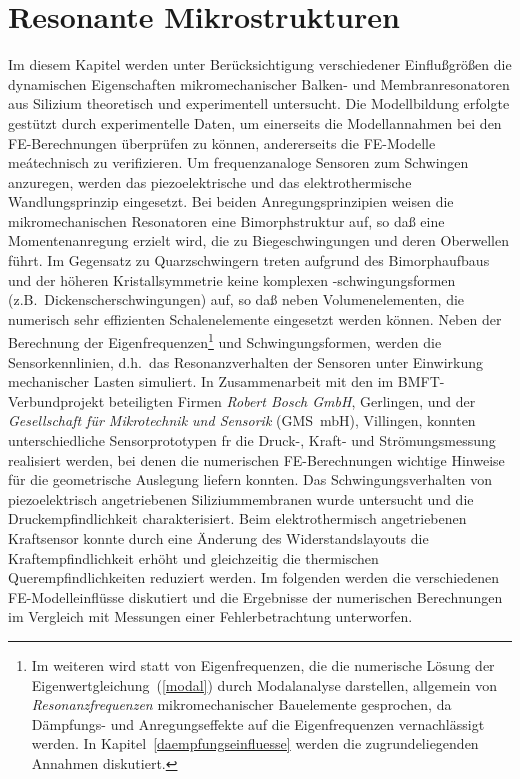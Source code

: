 \chapter{Resonante Mikrostrukturen}
\label{schwingungsverhalten}

Im diesem Kapitel werden unter Berücksichtigung verschiedener
Einflußgrößen die dynamischen Eigenschaften mikromechanischer
Balken- und Membranresonatoren aus Silizium
theoretisch und experimentell untersucht. Die Modellbildung
erfolgte gestützt durch experimentelle Daten, um einerseits die
Modellannahmen bei den FE-Berechnungen überprüfen zu können,
andererseits die FE-Modelle meátechnisch zu verifizieren.
Um fre\-quenzanaloge Sensoren zum Schwingen anzuregen, werden das
piezoelektrische und das elektrothermische Wandlungsprinzip eingesetzt.
Bei beiden Anregungsprinzipien weisen die mikromechanischen
Resonatoren eine Bimorphstruktur auf, so daß eine Momentenanregung erzielt
wird, die zu Biegeschwingungen und deren Oberwellen führt. Im Gegensatz
zu Quarzschwingern treten aufgrund des Bimorphaufbaus und der höheren
Kristallsymmetrie keine komplexen -schwingungsformen
(z.B.\ Dickenscherschwingungen) auf, so daß neben Volumenelementen,
die numerisch sehr effizienten Schalenelemente eingesetzt werden können.
Neben der Berechnung der Eigenfrequenzen\footnote{Im weiteren wird statt
von Eigenfrequenzen, die die numerische Lösung der
Eigenwertgleichung~(\ref{modal}) durch Modalanalyse darstellen, allgemein
von {\em Resonanzfrequenzen} mikromechanischer Bauelemente gesprochen, da
Dämpfungs- und Anregungseffekte auf die Eigenfrequenzen vernachlässigt
werden. In Kapitel~\ref{daempfungseinfluesse} werden die zugrundeliegenden
Annahmen diskutiert.}
und Schwingungsformen, werden die
Sensorkennlinien, d.h.\ das Resonanzverhalten der Sensoren unter Einwirkung
mechanischer Lasten simuliert. In Zusammenarbeit mit den
im BMFT-Verbundprojekt beteiligten Firmen {\em Robert Bosch GmbH},
Gerlingen, und der {\em Gesellschaft für Mikrotechnik und Sensorik}
(GMS~mbH), Villingen, konnten unterschiedliche
Sensorprototypen fr die Druck-, Kraft- und Strömungsmessung
realisiert werden, bei denen die numerischen FE-Berechnungen
wichtige Hinweise für die geometrische Auslegung liefern konnten.
Das Schwingungsverhalten von piezoelektrisch angetriebenen Siliziummembranen
wurde untersucht und die Druckempfindlichkeit charakterisiert.
Beim elektrothermisch angetriebenen Kraftsensor konnte durch eine
Änderung des Widerstandslayouts die Kraftempfindlichkeit erhöht und
gleichzeitig die thermischen Querempfindlichkeiten reduziert werden.
Im folgenden werden die verschiedenen FE-Modelleinflüsse diskutiert
und die Ergebnisse der numerischen Berechnungen im Vergleich mit
Messungen einer Fehlerbetrachtung unterworfen.


